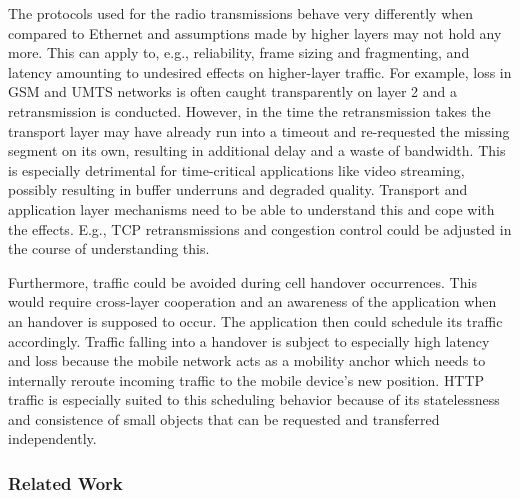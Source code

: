 
The protocols used for the radio transmissions behave very differently when compared to Ethernet and assumptions made by higher layers may not hold any more. This can apply to, e.g., reliability, frame sizing and fragmenting, and latency amounting to undesired effects on higher-layer traffic. For example, loss in \gls{GSM} and \gls{UMTS} networks is often caught transparently on layer 2 and a retransmission is conducted. However, in the time the retransmission takes the transport layer may have already run into a timeout and re-requested the missing segment on its own, resulting in additional delay and a waste of bandwidth. This is especially detrimental for time-critical applications like video streaming, possibly resulting in buffer underruns and degraded quality. Transport and application layer mechanisms need to be able to understand this and cope with the effects. E.g., \gls{TCP} retransmissions and congestion control could be adjusted in the course of understanding this.

Furthermore, traffic could be avoided during cell handover occurrences. This would require cross-layer cooperation and an awareness of the application when an handover is supposed to occur. The application then could schedule its traffic accordingly. Traffic falling into a handover is subject to especially high latency and loss because the mobile network acts as a mobility anchor which needs to internally reroute incoming traffic to the mobile device's new position. \gls{HTTP} traffic is especially suited to this scheduling behavior because of its statelessness and consistence of small objects that can be requested and transferred independently.


\subsubsection{Related Work}

